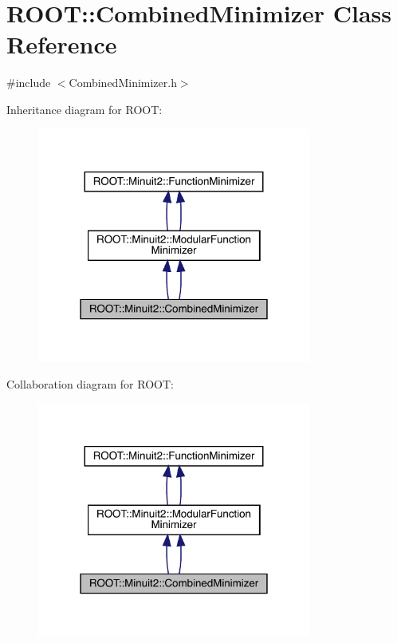 \hypertarget{classROOT_1_1Minuit2_1_1CombinedMinimizer}{}\section{R\+O\+OT\+:\+:Combined\+Minimizer Class Reference}
\label{classROOT_1_1Minuit2_1_1CombinedMinimizer}


{\ttfamily \#include $<$Combined\+Minimizer.\+h$>$}



Inheritance diagram for R\+O\+OT\+:\nopagebreak
\begin{figure}[H]
\begin{center}
\leavevmode
\includegraphics[width=255pt]{d1/d12/classROOT_1_1Minuit2_1_1CombinedMinimizer__inherit__graph}
\end{center}
\end{figure}


Collaboration diagram for R\+O\+OT\+:\nopagebreak
\begin{figure}[H]
\begin{center}
\leavevmode
\includegraphics[width=255pt]{de/d4a/classROOT_1_1Minuit2_1_1CombinedMinimizer__coll__graph}
\end{center}
\end{figure}
